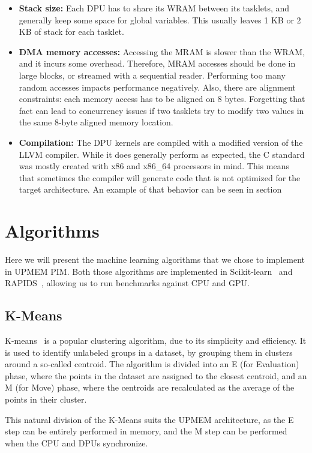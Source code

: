 \begin{itemize}
    \item \textbf{Stack size:} Each DPU has to share its WRAM between its tasklets, and generally keep some space for global variables. This usually leaves 1 KB or 2 KB of stack for each tasklet.
    \item \textbf{DMA memory accesses:} Accessing the MRAM is slower than the WRAM, and it incurs some overhead. Therefore, MRAM accesses should be done in large blocks, or streamed with a sequential reader. Performing too many random accesses impacts performance negatively. Also, there are alignment constraints: each memory access has to be aligned on 8 bytes. Forgetting that fact can lead to concurrency issues if two tasklets try to modify two values in the same 8-byte aligned memory location.
    \item \textbf{Compilation:} The DPU kernels are compiled with a modified version of the LLVM compiler. While it does generally perform as expected, the C standard was mostly created with x86 and x86\_64 processors in mind. This means that sometimes the compiler will generate code that is not optimized for the target architecture. An example of that behavior can be seen in section %
\end{itemize}

\section{Algorithms}

Here we will present the machine learning algorithms that we chose to implement in UPMEM PIM. Both those algorithms are implemented in Scikit-learn~\cite{pedregosa2011scikit} and RAPIDS~\cite{rapids}, allowing us to run benchmarks against CPU and GPU.

\subsection{K-Means}

K-means~\cite{Lloyd82leastsquares} is a popular clustering algorithm, due to its simplicity and efficiency. It is used to identify unlabeled groups in a dataset, by grouping them in clusters around a so-called centroid. The algorithm is divided into an E (for Evaluation) phase, where the points in the dataset are assigned to the closest centroid, and an M (for Move) phase, where the centroids are recalculated as the average of the points in their cluster.

This natural division of the K-Means suits the UPMEM architecture, as the E step can be entirely performed in memory, and the M step can be performed when the CPU and DPUs synchronize.

